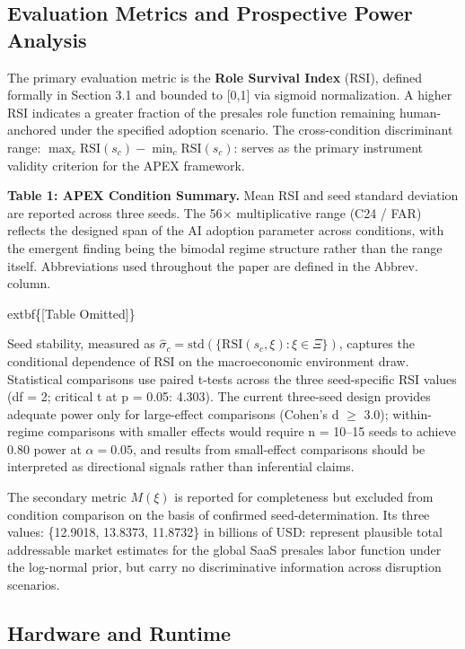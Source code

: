 \documentclass[10pt, conference]{IEEEtran}
\begin{document}
\subsection{Evaluation Metrics and Prospective Power Analysis}

\label{sec:evaluation_metrics_and_prospective_power}

The primary evaluation metric is the \textbf{Role Survival Index} (RSI), defined formally in Section 3.1 and bounded to [0,1] via sigmoid normalization. A higher RSI indicates a greater fraction of the presales role function remaining human-anchored under the specified adoption scenario. The cross-condition discriminant range: $\max_c \text{RSI}(s_c) - \min_c \text{RSI}(s_c)$: serves as the primary instrument validity criterion for the APEX framework.

\textbf{Table 1: APEX Condition Summary.} Mean RSI and seed standard deviation are reported across three seeds. The 56$\times$ multiplicative range (C24 / FAR) reflects the designed span of the AI adoption parameter across conditions, with the emergent finding being the bimodal regime structure rather than the range itself. Abbreviations used throughout the paper are defined in the Abbrev. column.

	extbf\{[Table Omitted]\}

Seed stability, measured as $\hat{\sigma}_c = \text{std}(\{\text{RSI}(s_c, \xi) : \xi \in \Xi\})$, captures the conditional dependence of RSI on the macroeconomic environment draw. Statistical comparisons use paired t-tests across the three seed-specific RSI values (df = 2; critical t at p = 0.05: 4.303). The current three-seed design provides adequate power only for large-effect comparisons (Cohen's d $\geq$ 3.0); within-regime comparisons with smaller effects would require n = 10--15 seeds to achieve 0.80 power at $\alpha = 0.05$, and results from small-effect comparisons should be interpreted as directional signals rather than inferential claims.

The secondary metric $M(\xi)$ is reported for completeness but excluded from condition comparison on the basis of confirmed seed-determination. Its three values: \{12.9018, 13.8373, 11.8732\} in billions of USD: represent plausible total addressable market estimates for the global SaaS presales labor function under the log-normal prior, but carry no discriminative information across disruption scenarios.

\subsection{Hardware and Runtime}
\end{document}
